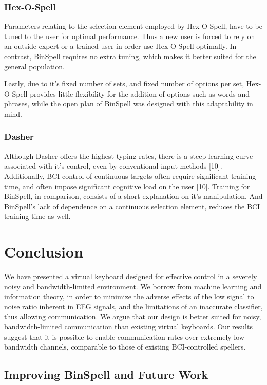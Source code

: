 \documentclass[12pt,titlepage]{article}
\begin{document}
\subsubsection{Hex-O-Spell}

Parameters relating to the selection element employed by Hex-O-Spell, have to be tuned to the 
user for optimal performance.  Thus a new user is forced to rely on an outside expert or a 
trained user in order use Hex-O-Spell optimally.  In contrast, BinSpell requires no extra tuning, 
which makes it better suited for the general population. 

Lastly, due to it's fixed number of sets, and fixed number of options per set, Hex-O-Spell 
provides little flexibility for the addition of options such as words and phrases, while the open 
plan of BinSpell was designed with this adaptability in mind.

\subsubsection{Dasher}

Although Dasher offers the highest typing rates, there is a steep learning curve associated with 
it's control, even by conventional input methods [10].  Additionally, BCI control of continuous 
targets often require significant training time, and often impose significant cognitive load on 
the user [10].  Training for BinSpell, in comparison, consists of a short explanation on it's 
manipulation.  And BinSpell's lack of dependence on a continuous selection element, reduces 
the BCI training time as well.


\section{Conclusion}

We have presented a virtual keyboard designed for effective control in a severely noisy and
bandwidth-limited environment.  We borrow from machine learning and  information theory, in 
order to minimize the adverse effects of the low signal to noise ratio inherent in EEG signals, 
and the limitations of an inaccurate classifier, thus allowing communication.  We argue that our 
design is better suited for noisy, bandwidth-limited communication than existing virtual 
keyboards. Our results suggest that it is possible to enable communication rates over extremely 
low bandwidth channels, comparable to those of existing BCI-controlled spellers.


\subsection{Improving BinSpell and Future Work}
\end{document}
